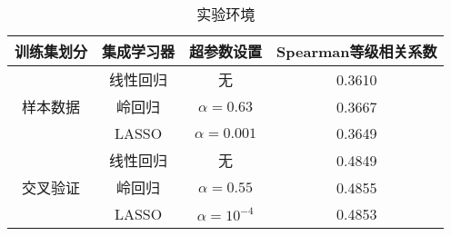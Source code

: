 \begin{table}[h]
	\caption{实验环境}
	\label{t:ensemble result}
	\vspace{0.5em}\centering\wuhao
	\begin{tabular}{cccc}
		\toprule[1.5pt]
		训练集划分 & 集成学习器 & 超参数设置 & Spearman等级相关系数 \\
		\midrule[1pt]
		\multirow{3}{*}{样本数据} & 线性回归 & 无 & 0.3610 \\
		& 岭回归 & $\alpha = 0.63$ & 0.3667 \\
		& LASSO & $\alpha = 0.001$ & 0.3649 \\
		\hline
		\multirow{3}{*}{交叉验证} & 线性回归 & 无 & 0.4849 \\
		& 岭回归 & $\alpha = 0.55$ & 0.4855 \\
		& LASSO & $\alpha = 10^{-4}$ & 0.4853 \\
		\bottomrule[1.5pt]
	\end{tabular}
\end{table}
